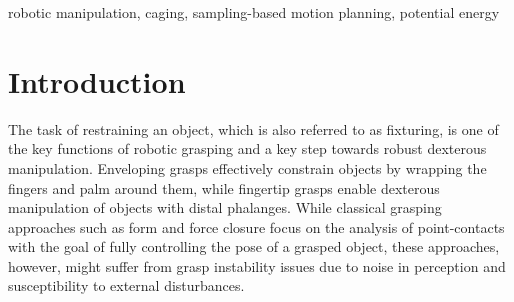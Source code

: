\documentclass[conference]{IEEEtran}
\begin{document}
	
	
	\begin{IEEEkeywords}
		robotic manipulation, caging, sampling-based motion planning, potential energy
	\end{IEEEkeywords}
	
	
	\section{Introduction}
	The task of restraining an object, which is also referred to as fixturing, is one of the key
	functions of robotic grasping \cite{b18} and a key step towards robust dexterous manipulation.
	Enveloping grasps \cite{b19} effectively constrain objects by wrapping the fingers and palm around
	them, while fingertip grasps enable dexterous manipulation of objects with distal phalanges. While
	classical grasping approaches such as form and force closure \cite{b20} focus on the analysis of
	point-contacts with the goal of fully controlling the pose of a grasped object, these approaches,
	however, might suffer from grasp instability issues due to noise in perception and susceptibility to external disturbances. 
	
\end{document}
